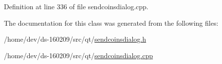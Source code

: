 Definition at line 336 of file sendcoinsdialog.\+cpp.



The documentation for this class was generated from the following files\+:\begin{DoxyCompactItemize}
\item 
/home/dev/ds-\/160209/src/qt/\hyperlink{sendcoinsdialog_8h}{sendcoinsdialog.\+h}\item 
/home/dev/ds-\/160209/src/qt/\hyperlink{sendcoinsdialog_8cpp}{sendcoinsdialog.\+cpp}\end{DoxyCompactItemize}

